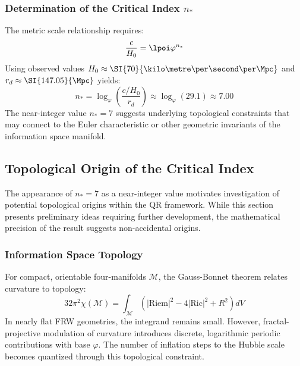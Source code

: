 \subsubsection{Determination of the Critical Index \texorpdfstring{$n_*$}{n*}}
\label{subsubsec:critical-index}

The metric scale relationship requires:
\begin{equation}
\frac{c}{H_0} = \lpoi \varphi^{n_*}
\label{eq:metric-scale}
\end{equation}
Using observed values $H_0 \approx \SI{70}{\kilo\metre\per\second\per\Mpc}$ and $r_d \approx \SI{147.05}{\Mpc}$ yields:
\begin{equation}
n_* = \log_\varphi\!\left(\frac{c/H_0}{r_d}\right) \approx \log_\varphi(29.1) \approx 7.00
\label{eq:critical-index-calculation}
\end{equation}
The near-integer value $n_* = 7$ suggests underlying topological constraints that may connect to the Euler characteristic or other geometric invariants of the information space manifold.

\subsection{Topological Origin of the Critical Index}
\label{subsec:topological-origin}

The appearance of $n_* = 7$ as a near-integer value motivates investigation of potential topological origins within the QR framework. While this section presents preliminary ideas requiring further development, the mathematical precision of the result suggests non-accidental origins.

\subsubsection{Information Space Topology}
\label{subsubsec:info-space-topology}

For compact, orientable four-manifolds $\mathcal{M}$, the Gauss-Bonnet theorem relates curvature to topology:
\begin{equation}
32\pi^2 \chi(\mathcal{M}) = \int_{\mathcal{M}} \left( |\text{Riem}|^2 - 4|\text{Ric}|^2 + R^2 \right) dV
\label{eq:gauss-bonnet}
\end{equation}
In nearly flat FRW geometries, the integrand remains small. However, fractal-projective modulation of curvature introduces discrete, logarithmic periodic contributions with base $\varphi$. The number of inflation steps to the Hubble scale becomes quantized through this topological constraint.

